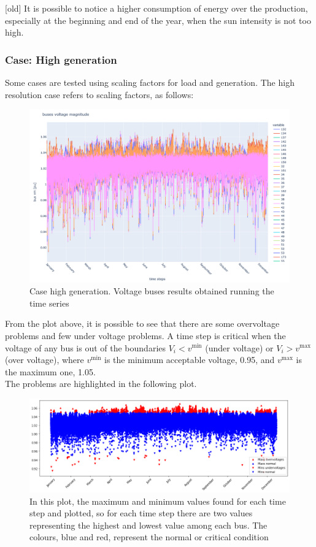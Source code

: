 [old] It is possible to notice a higher consumption of energy over the production, especially at the beginning and end of the year, when the sun intensity is not too high. \\

\subsubsection{Case: High generation}
Some cases are tested using scaling factors for load and generation. The high resolution case refers to scaling factors, as follows:
\begin{algorithm}[h]
    
\end{algorithm}

\begin{figure}[H]
\centering
    \includegraphics[width=.7\linewidth]{images/MVOberr/High gen.png}
\caption{Case high generation. Voltage buses results obtained running the time series}
\label{fig:gym_anm_net}
\end{figure}

From the plot above, it is possible to see that there are some overvoltage problems and few under voltage problems. A time step is critical when the voltage of any bus is out of the boundaries $V_i < v^{\text{min}}$ (under voltage) or $V_i > v^{\text{max}}$ (over voltage), where $v^{\text{min}}$ is the minimum acceptable voltage, 0.95, and $v^{\text{max}}$ is the maximum one, 1.05. \\
The problems are highlighted in the following plot.

\begin{figure}[H]
\centering
    \includegraphics[width=.8\linewidth]{images/MVOberr/High gen problems.png}
\caption{In this plot, the maximum and minimum values found for each time step and plotted, so for each time step there are two values representing the highest and lowest value among each bus. The colours, blue and red, represent the normal or critical condition}

 \end{figure}


